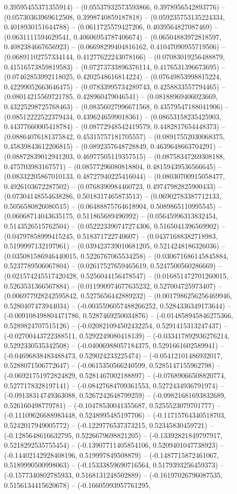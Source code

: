 0.39595455371355914) -- (0.05537932573593866, 0.3978956542893776) -- (0.05730363969612508, 0.3998740859187818) -- (0.059235753135224334, 0.4018930151644788) -- (0.0611725579427206, 0.4039564827087469) -- (0.0631111594629541, 0.40606954787406674) -- (0.06504883972818597, 0.4082384667656923) -- (0.06698299404816162, 0.41047090955719506) -- (0.06891102757334144, 0.41277622243078166) -- (0.07083019256488879, 0.41516573859819583) -- (0.07273733896376114, 0.4176531396673695) -- (0.07462853992118025, 0.4202548616814224) -- (0.07649853998815224, 0.42299052663646475) -- (0.07833995734289743, 0.4258833557794465) -- (0.08014215569721785, 0.428960479046541) -- (0.08188969406023669, 0.43225298725768463) -- (0.08356027996671568, 0.43579547188041906) -- (0.08512222522379434, 0.4396246599018361) -- (0.08653158235425903, 0.44377660005418784) -- (0.08772948542419579, 0.4482817654448373) -- (0.08864076181375842, 0.45315757181705557) -- (0.08917552030068375, 0.45839843612206815) -- (0.0892357648728849, 0.4639648663704291) -- (0.08872839012941203, 0.46977505119357515) -- (0.08758347269308188, 0.475703983167571) -- (0.08577296080818804, 0.48159439536566645) -- (0.08332205867010133, 0.48727940225416044) -- (0.08030700915058477, 0.4926103672287502) -- (0.0768390984460723, 0.49747982825900433) -- (0.07304148554638286, 0.5018317465873513) -- (0.06902783387712133, 0.5056580826080515) -- (0.06488875764618904, 0.5089865110995545) -- (0.06068714043635175, 0.511865689496992) -- (0.05645996313832454, 0.5143526515762504) -- (0.052223390747274306, 0.5165041396569902) -- (0.04797858999415245, 0.518371722740607) -- (0.04371688382718983, 0.5199997132197961) -- (0.039423739010681205, 0.5214248186326036) -- (0.035081586946440015, 0.5226767065534258) -- (0.030671686145845884, 0.5237789506067804) -- (0.02617527659465619, 0.5247500560286669) -- (0.021574245517420428, 0.5256044156478547) -- (0.016851472701260015, 0.5263531366567884) -- (0.011990974677635232, 0.527004725973407) -- (0.006977928242595842, 0.5275656442889232) -- (0.0017986256256469946, 0.5280407473944034) -- (-0.0035596057488266252, 0.5284336349173644) -- (-0.009108498804471786, 0.5287469250034876) -- (-0.014858945846275366, 0.5289824707515126) -- (-0.020821094502432254, 0.5291415313247437) -- (-0.02700443722388511, 0.5292249080418139) -- (-0.033417892936276214, 0.5292330535342508) -- (-0.04006988057184375, 0.5291661602589941) -- (-0.04696838483488473, 0.529024233225474) -- (-0.05412101486932017, 0.5288071506772647) -- (-0.0615350566240599, 0.5285147155962798) -- (-0.06921751972824829, 0.5281467002188897) -- (-0.07689066508820774, 0.5277178328197141) -- (-0.08427684709361553, 0.5272434936791974) -- (-0.09138314749363088, 0.5267242648799259) -- (-0.09821681693832689, 0.526160498779781) -- (-0.10478530041355687, 0.5255523079701777) -- (-0.11109626688983448, 0.5248995485197706) -- (-0.11715764340518703, 0.5242017949005772) -- (-0.1229776537373215, 0.52345830459721) -- (-0.1285648616632795, 0.5226679698821205) -- (-0.13392821849797917, 0.5218292535755454) -- (-0.13907711405854106, 0.5209401047738923) -- (-0.14402142928408196, 0.519997849508879) -- (-0.1487715872461067, 0.5189990500998063) -- (-0.15333859690716564, 0.5179393256459373) -- (-0.1577340802785933, 0.5168131248502889) -- (-0.16197026796087535, 0.5156134415620678) -- (-0.16605993957761295, 